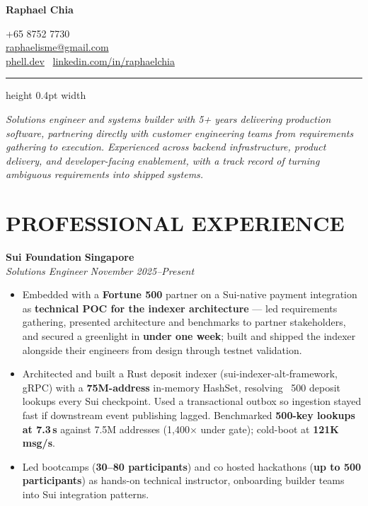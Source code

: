 \documentclass[11pt,letterpaper]{article}
\newcommand{\header}[2]{%
  \noindent
  \begin{minipage}[t]{0.55\textwidth}
    \LARGE\textbf{#1}
  \end{minipage}%
  \hfill
  \begin{minipage}[t]{0.42\textwidth}
    \small\raggedleft
    #2
  \end{minipage}
  \par\vspace{0.15em}
  \hrule height 0.4pt width \textwidth
  \vspace{0.15em}
}
\newcommand{\role}[4]{
  \vspace{0.15em}
  \begin{center}
  \textbf{#1} \hfill \textbf{#2} \\
  \textit{#3} \hfill \textit{#4}
  \end{center}
  \vspace{-1em}
}
\begin{document}
\header{Raphael Chia}{%
  +65 8752 7730 \\
  \href{mailto:raphaelisme@gmail.com}{raphaelisme@gmail.com} \\
  \href{https://phell.dev}{phell.dev} \textbar\ \href{https://linkedin.com/in/raphaelchia}{linkedin.com/in/raphaelchia}%
}

\vspace{-0.35em}
\begin{center}
\textit{Solutions engineer and systems builder with 5+ years delivering production software, partnering directly with customer engineering teams from requirements gathering to execution. Experienced across backend infrastructure, product delivery, and developer-facing enablement, with a track record of turning ambiguous requirements into shipped systems.}
\end{center}

\section{PROFESSIONAL EXPERIENCE}

\role{Sui Foundation}{Singapore}{Solutions Engineer}{November 2025--Present}
\begin{itemize}
  \item Embedded with a \textbf{Fortune 500} partner on a Sui-native payment integration as \textbf{technical POC for the indexer architecture} — led requirements gathering, presented architecture and benchmarks to partner stakeholders, and secured a greenlight in \textbf{under one week}; built and shipped the indexer alongside their engineers from design through testnet validation.
  \item Architected and built a Rust deposit indexer (sui-indexer-alt-framework, gRPC) with a \textbf{75M-address} in-memory HashSet, resolving ~500 deposit lookups every Sui checkpoint. Used a transactional outbox so ingestion stayed fast if downstream event publishing lagged. Benchmarked \textbf{500-key lookups at 7.3\,\textmu s} against 7.5M addresses (1,400$\times$ under gate); cold-boot at \textbf{121K\,msg/s}.
  \item Led bootcamps (\textbf{30--80 participants}) and co hosted hackathons (\textbf{up to 500 participants}) as hands-on technical instructor, onboarding builder teams into Sui integration patterns.
\end{itemize}
\end{document}
